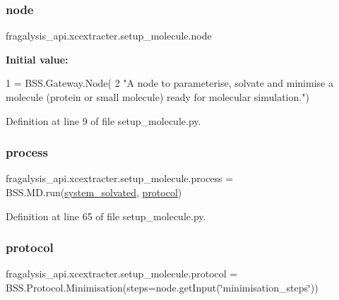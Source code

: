 \subsubsection{\texorpdfstring{node}{node}}
{\footnotesize\ttfamily fragalysis\+\_\+api.\+xcextracter.\+setup\+\_\+molecule.\+node}

{\bfseries Initial value\+:}
\begin{DoxyCode}
1 =  BSS.Gateway.Node(
2     \textcolor{stringliteral}{"A node to parameterise, solvate and minimise a molecule (protein or small molecule) ready for
       molecular simulation."})
\end{DoxyCode}


Definition at line 9 of file setup\+\_\+molecule.\+py.

\mbox{\label{namespacefragalysis__api_1_1xcextracter_1_1setup__molecule_a2cff9ddb655b70c89221382a00670e45}} 
\subsubsection{\texorpdfstring{process}{process}}
{\footnotesize\ttfamily fragalysis\+\_\+api.\+xcextracter.\+setup\+\_\+molecule.\+process = B\+S\+S.\+M\+D.\+run(\hyperlink{namespacefragalysis__api_1_1xcextracter_1_1setup__molecule_a3eab3585c91264e66a041fdb0932fd48}{system\+\_\+solvated}, \hyperlink{namespacefragalysis__api_1_1xcextracter_1_1setup__molecule_a60658f36df878e49b5cef0787f10b91a}{protocol})}



Definition at line 65 of file setup\+\_\+molecule.\+py.

\mbox{\label{namespacefragalysis__api_1_1xcextracter_1_1setup__molecule_a60658f36df878e49b5cef0787f10b91a}} 
\subsubsection{\texorpdfstring{protocol}{protocol}}
{\footnotesize\ttfamily fragalysis\+\_\+api.\+xcextracter.\+setup\+\_\+molecule.\+protocol = B\+S\+S.\+Protocol.\+Minimisation(steps=node.\+get\+Input(\char`\"{}minimisation\+\_\+steps\char`\"{}))}



